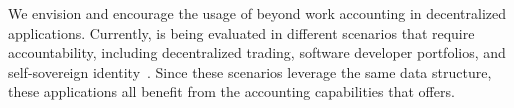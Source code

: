 We envision and encourage the usage of \TrustChain{} beyond work accounting in decentralized applications.
Currently, \TrustChain{} is being evaluated in different scenarios that require accountability, including decentralized trading, software developer portfolios, and self-sovereign identity~\cite{de2021xchange,de2019devid,stokkink2018deployment}.
Since these scenarios leverage the same data structure, these applications all benefit from the accounting capabilities that \ModelName{} offers.